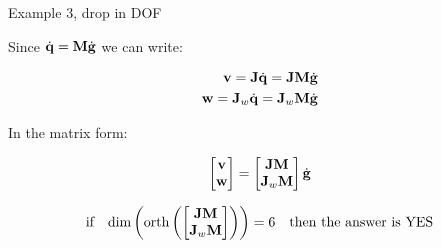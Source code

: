 \documentclass{beamer}
\begin{document}
\begin{frame}{Example 3, drop in DOF}
	\begin{flushleft}
		
		Since $\dot{\mathbf{q}} = \mathbf{M}\dot{\mathbf{g}}$ we can write:
		
		\begin{align}
			\mathbf{v} = \mathbf{J} \dot{\mathbf{q}} = \mathbf{J} \mathbf{M}\dot{\mathbf{g}}
			\\
			\mathbf{w} = \mathbf{J}_w \dot{\mathbf{q}}= \mathbf{J}_w \mathbf{M}\dot{\mathbf{g}}
		\end{align}
		
		In the matrix form:
		
		\begin{align}
			\begin{bmatrix}
					\mathbf{v} \\ \mathbf{w}
			\end{bmatrix}
			=
			\begin{bmatrix}
				\mathbf{J} \mathbf{M} \\ \mathbf{J}_w \mathbf{M}
			\end{bmatrix}
		\dot{\mathbf{g}}
		\end{align}
		
		\begin{align}
					\text{if} \ \ \ 
					\text{dim}   \left(  \text{orth}\left( \begin{bmatrix}
				\bo{J} \bo{M} \\ \bo{J}_w \bo{M}
			\end{bmatrix} \right) \right)
			= 6 \ \ \ \text{then the answer is YES}
		\end{align}
		

		
	\end{flushleft}
\end{frame}
\end{document}
